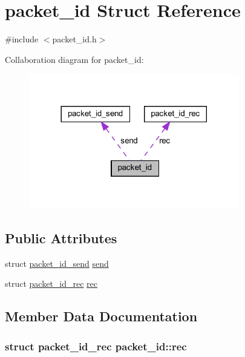 \hypertarget{structpacket__id}{}\section{packet\+\_\+id Struct Reference}
\label{structpacket__id}


{\ttfamily \#include $<$packet\+\_\+id.\+h$>$}



Collaboration diagram for packet\+\_\+id\+:
\nopagebreak
\begin{figure}[H]
\begin{center}
\leavevmode
\includegraphics[width=260pt]{structpacket__id__coll__graph}
\end{center}
\end{figure}
\subsection*{Public Attributes}
\begin{DoxyCompactItemize}
\item 
struct \hyperlink{structpacket__id__send}{packet\+\_\+id\+\_\+send} \hyperlink{structpacket__id_a3bbfd45d7cf1f212388801261ca8dfae}{send}
\item 
struct \hyperlink{structpacket__id__rec}{packet\+\_\+id\+\_\+rec} \hyperlink{structpacket__id_a8545f0573b043467eda975acf6ca99f1}{rec}
\end{DoxyCompactItemize}


\subsection{Member Data Documentation}
\hypertarget{structpacket__id_a8545f0573b043467eda975acf6ca99f1}{}
\subsubsection[{rec}]{\setlength{\rightskip}{0pt plus 5cm}struct {\bf packet\+\_\+id\+\_\+rec} packet\+\_\+id\+::rec}\label{structpacket__id_a8545f0573b043467eda975acf6ca99f1}
\hypertarget{structpacket__id_a3bbfd45d7cf1f212388801261ca8dfae}{}
